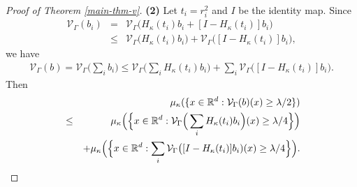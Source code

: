 \documentclass[11pt,a4paper]{article}
\def\R{\mathbb{R}}
\theoremstyle{definition}\newtheorem{remark}[theorem]{Remark}
\begin{document}
\begin{proof}[Proof of Theorem \ref{main-thm-v}]
\textbf{(2)} Let $t_i=r_i^2$ and $I$ be the identity map. Since
\begin{eqnarray*}
\mathcal{V}_{\Gamma}(b_i)&=&\mathcal{V}_{\Gamma}\big(H_\kappa(t_i)b_i+ [I-H_\kappa(t_i)]b_i\big)\\
&\leq&\mathcal{V}_{\Gamma}\big(H_\kappa(t_i)b_i)+\mathcal{V}_{\Gamma}\big([I-H_\kappa(t_i)]b_i),
\end{eqnarray*}
we have
\begin{eqnarray*}
\mathcal{V}_{\Gamma}(b)=\mathcal{V}_{\Gamma}\Big(\sum_i b_i\Big)\leq\mathcal{V}_{\Gamma}\Big(\sum_i H_\kappa(t_i)b_i\Big)+\sum_i\mathcal{V}_{\Gamma}\big([I-H_\kappa(t_i)]b_i).
\end{eqnarray*}
Then
\begin{eqnarray}\label{proof-main-3}
&&\mu_\kappa(\{x\in\R^d: \mathcal{V}_{\Gamma}(b)(x)\geq \lambda/2\})\cr
&\leq&\mu_\kappa\Big(\Big\{x\in\R^d: \mathcal{V}_{\Gamma}\Big(\sum_i H_\kappa(t_i)b_i\Big)(x)\geq \lambda/4\Big\}\Big)\cr
&&+\mu_\kappa\Big(\Big\{x\in\R^d: \sum_i\mathcal{V}_{\Gamma}\big([I-H_\kappa(t_i)]b_i)(x)\geq \lambda/4\Big\}\Big).
\end{eqnarray}


\end{proof}
\end{document}
